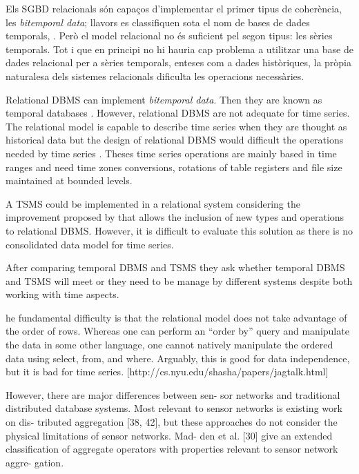 Els SGBD relacionals són capaços d'implementar el primer tipus de coherència, les \emph{bitemporal data}; llavors es classifiquen sota el nom de bases de dades temporals, \cite{date:introduction,wiki:temporal_database}. Però el model relacional no és suficient pel segon tipus: les sèries temporals. Tot i que en principi no hi hauria cap problema a utilitzar una base de dades relacional per a sèries temporals, enteses com a dades històriques, la pròpia naturalesa dels sistemes relacionals  dificulta les operacions necessàries. 


Relational DBMS can implement \emph{bitemporal data}. Then they are known as temporal databases \parencite[ch.\ 22]{date:introduction}. However, relational DBMS are not adequate for time series. The relational model is capable to describe time series when they are thought as historical data but the design of relational DBMS would difficult the operations  needed by time series \parencite{schmidt95}. Theses time series operations are mainly based in time ranges and need time zones conversions, rotations of table registers and file size maintained at bounded levels.


A TSMS could be implemented in a relational system considering the improvement proposed by \textcite{stonebraker86} that allows the inclusion of new types and operations to relational DBMS. However, it is difficult to evaluate this solution as there is no consolidated data model  for time series. 

After comparing temporal DBMS and TSMS \parencite{schmidt95} they ask whether temporal DBMS and TSMS will meet or they need to be manage by different systems despite both working with time aspects.


he fundamental difficulty is that the relational model does not take advantage of the order of rows. Whereas one can perform an ``order by'' query and manipulate the data in some other language, one cannot natively manipulate the ordered data using select, from, and where. 
Arguably, this is good for data independence, but it is bad for time series.
[http://cs.nyu.edu/shasha/papers/jagtalk.html]

        However, there are major differences between sen-
sor networks and traditional distributed database systems.
Most relevant to sensor networks is existing work on dis-
tributed aggregation [38, 42], but these approaches do not
consider the physical limitations of sensor networks. Mad-
den et al. [30] give an extended classification of aggregate
operators with properties relevant to sensor network aggre-
gation. %


